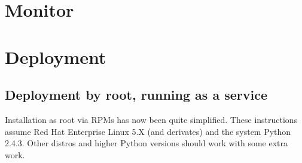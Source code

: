 \documentclass[a4paper]{jpconf}
\begin{document}
\section{Monitor}

\section{Deployment}

\subsection{Deployment by root, running as a service}

Installation as root via RPMs has now been quite simplified. 
These instructions assume Red Hat Enterprise Linux 5.X (and derivates) and the system Python 2.4.3. 
Other distros and higher Python versions should work with some extra work.
\end{document}
